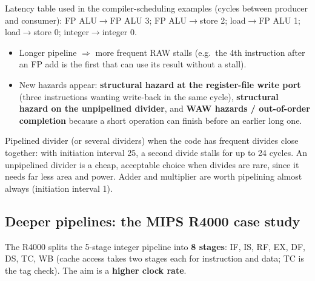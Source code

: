 Latency table used in the compiler-scheduling examples (cycles between producer and consumer): FP ALU$\rightarrow$FP ALU 3; FP ALU$\rightarrow$store 2; load$\rightarrow$FP ALU 1; load$\rightarrow$store 0; integer$\rightarrow$integer 0.

\begin{itemize}
\item Longer pipeline $\Rightarrow$ more frequent RAW stalls (e.g.\ the 4th instruction after an FP add is the first that can use its result without a stall).
\item New hazards appear: \textbf{structural hazard at the register-file write port} (three instructions wanting write-back in the same cycle), \textbf{structural hazard on the unpipelined divider}, and \textbf{WAW hazards / out-of-order completion} because a short operation can finish before an earlier long one.
\end{itemize}

\begin{pick}
Pipelined divider (or several dividers) when the code has frequent divides close together: with initiation interval 25, a second divide stalls for up to 24 cycles. An unpipelined divider is a cheap, acceptable choice when divides are rare, since it needs far less area and power. Adder and multiplier are worth pipelining almost always (initiation interval 1).
\end{pick}

\subsection{Deeper pipelines: the MIPS R4000 case study}
The R4000 splits the 5-stage integer pipeline into \textbf{8 stages}: IF, IS, RF, EX, DF, DS, TC, WB (cache access takes two stages each for instruction and data; TC is the tag check). The aim is a \textbf{higher clock rate}.

